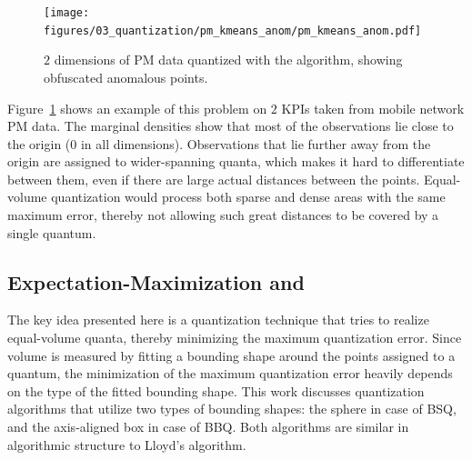 			\begin{figure}[ht]
				\centering
				\texttt{[image: figures/03\_quantization/pm\_kmeans\_anom/pm\_kmeans\_anom.pdf]}
				\caption[\kmeans{} quantization on PM data]{$2$ dimensions of PM data quantized with the \kmeans{} algorithm, showing obfuscated anomalous points.}
				\label{fig:kmeansanom}
			\end{figure}
			
			Figure~\ref{fig:kmeansanom} shows an example of this problem on $2$ \acp{KPI} taken from mobile network \ac{PM} data.
			The marginal densities show that most of the observations lie close to the origin ($0$ in all dimensions).
			Observations that lie further away from the origin are assigned to wider-spanning quanta, which makes it hard to differentiate between them, even if there are large actual distances between the points.
			Equal-volume quantization would process both sparse and dense areas with the same maximum error, thereby not allowing such great distances to be covered by a single quantum.
			
		\subsection{Expectation-Maximization and \kmeans{}}
			
			The key idea presented here is a quantization technique that tries to realize equal-volume quanta, thereby minimizing the maximum quantization error.
			Since volume is measured by fitting a bounding shape around the points assigned to a quantum, the minimization of the maximum quantization error heavily depends on the type of the fitted bounding shape.
			This work discusses quantization algorithms that utilize two types of bounding shapes: the sphere in case of \ac{BSQ}, and the axis-aligned box in case of \ac{BBQ}.
			Both algorithms are similar in algorithmic structure to Lloyd's  algorithm.
			
